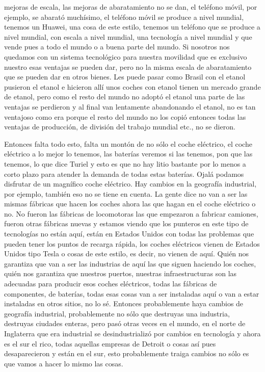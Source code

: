 mejoras de escala, las mejoras de abaratamiento no se dan, el teléfono móvil, por ejemplo, se abarató muchísimo, el teléfono móvil se produce a nivel mundial, tenemos un Huawei, una cosa de este estilo, tenemos un teléfono que se produce a nivel mundial, con escala a nivel mundial, una tecnología a nivel mundial y que vende pues a todo el mundo o a buena parte del mundo. Si nosotros nos quedamos con un sistema tecnológico para nuestra movilidad que es exclusivo nuestro esas ventajas se pueden dar, pero no la misma escala de abaratamiento que se pueden dar en otros bienes. Les puede pasar como Brasil con el etanol pusieron el etanol e hicieron allí unos coches con etanol tienen un mercado grande de etanol, pero como el resto del mundo no adoptó el etanol una parte de las ventajas se perdieron y al final van lentamente abandonando el etanol, no es tan ventajoso como era porque el resto del mundo no los copió entonces todas las ventajas de producción, de división del trabajo mundial etc., no se dieron.

Entonces falta todo esto, falta un montón de no sólo el coche eléctrico, el coche eléctrico a lo mejor lo tenemos, las baterías veremos si las tenemos, pon que las tenemos, lo que dice Turiel y esto es que no hay litio bastante por lo menos a corto plazo para atender la demanda de todas estas baterías. Ojalá podamos disfrutar de un magnífico coche eléctrico. Hay cambios en la geografía industrial, por ejemplo, también eso no se tiene en cuenta. La gente dice no van a ser las mismas fábricas que hacen los coches ahora las que hagan en el coche eléctrico o no. No fueron las fábricas de locomotoras las que empezaron a fabricar camiones, fueron otras fábricas nuevas y estamos viendo que los punteros en este tipo de tecnologías no están aquí, están en Estados Unidos con todas las problemas que pueden tener los puntos de recarga rápida, los coches eléctricos vienen de Estados Unidos tipo Tesla o cosas de este estilo, es decir, no vienen de aquí. Quién nos garantiza que van a ser las industrias de aquí las que siguen haciendo los coches, quién nos garantiza que nuestros puertos, nuestras infraestructuras son las adecuadas para producir esos coches eléctricos, todas las fábricas de componentes, de baterías, todas esas cosas van a ser instaladas aquí o van a estar instaladas en otros sitios, no lo sé. Entonces probablemente haya cambios de geografía industrial, probablemente no sólo que destruyas una industria, destruyas ciudades enteras, pero pasó otras veces en el mundo, en el norte de Inglaterra que era industrial se desindustrializó por cambios en tecnología y ahora es el sur el rico, todas aquellas empresas de Detroit o cosas así pues desaparecieron y están en el sur, esto probablemente traiga cambios no sólo es que vamos a hacer lo mismo las cosas.

